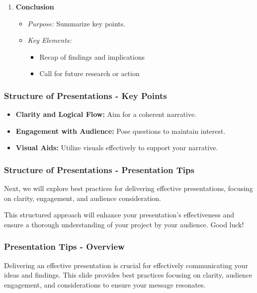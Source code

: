 \documentclass[aspectratio=169]{beamer}
\begin{document}
\begin{frame}[fragile]
\begin{enumerate}
        \item \textbf{Conclusion}
            \begin{itemize}
                \item \textit{Purpose:} Summarize key points.
                \item \textit{Key Elements:}
                    \begin{itemize}
                        \item Recap of findings and implications
                        \item Call for future research or action
                    \end{itemize}
            \end{itemize}
    \end{enumerate}
\end{frame}

\begin{frame}[fragile]
    \frametitle{Structure of Presentations - Key Points}
    \begin{itemize}
        \item \textbf{Clarity and Logical Flow:} Aim for a coherent narrative.
        \item \textbf{Engagement with Audience:} Pose questions to maintain interest.
        \item \textbf{Visual Aids:} Utilize visuals effectively to support your narrative.
    \end{itemize}
\end{frame}

\begin{frame}[fragile]
    \frametitle{Structure of Presentations - Presentation Tips}
    Next, we will explore best practices for delivering effective presentations, focusing on clarity, engagement, and audience consideration.

    This structured approach will enhance your presentation's effectiveness and ensure a thorough understanding of your project by your audience. Good luck!
\end{frame}

\begin{frame}[fragile]
    \frametitle{Presentation Tips - Overview}
    Delivering an effective presentation is crucial for effectively communicating your ideas and findings. This slide provides best practices focusing on clarity, audience engagement, and considerations to ensure your message resonates.
\end{frame}
\end{document}
